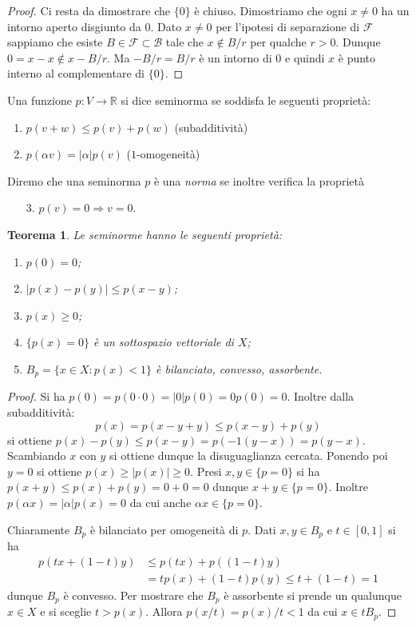 \documentclass[italian,a4paper,oneside,headinclude]{scrbook}
\newcommand{\B}{\mathcal B}
\newcommand{\F}{\mathcal F}
\newcommand{\RR}{\mathbb R}
\newcommand{\abs}[1]{{\left|#1\right|}}
\newtheorem{theorem}{Teorema}
\begin{document}
\begin{proof}
  Ci resta da dimostrare che $\{0\}$ è chiuso. Dimostriamo che ogni
  $x\neq 0$ ha un intorno aperto disgiunto da $0$. Dato $x\neq 0$ per
  l'ipotesi di separazione di $\F$ sappiamo che esiste
  $B\in \F\subset \B$ tale che $x \not \in B/r$ per qualche
  $r>0$. Dunque $0 = x- x \not \in x- B/r$. Ma $-B/r = B/r$ è un
  intorno di $0$ e quindi $x$ è punto interno al complementare di $\{0\}$.

\end{proof}

Una funzione $p\colon V \to \RR$ si dice seminorma se soddisfa le
seguenti proprietà:
\begin{enumerate}
\item $p(v+w)\le p(v) + p(w)$ (subadditività)
\item $p(\alpha v) = \abs{\alpha} p(v)$ ($1$-omogeneità)
\end{enumerate}
Diremo che una seminorma $p$ è una \emph{norma} se inoltre verifica la
proprietà
\begin{enumerate}
  \item[3.] $p(v)=0 \Rightarrow v=0$.
\end{enumerate}

\begin{theorem}
  Le seminorme hanno le seguenti proprietà:
  \begin{enumerate}
  \item $p(0)=0$;
  \item $\abs{p(x)-p(y)} \le p(x-y)$;
  \item $p(x)\ge 0$;
  \item $\{p(x) = 0\}$ è un sottospazio vettoriale di $X$;
  \item $B_p=\{x\in X\colon p(x)<1\} $ è bilanciato, convesso, assorbente.
  \end{enumerate}
\end{theorem}

\begin{proof}
  Si ha  $p(0) = p(0\cdot 0) = \abs{0}p(0) = 0p(0) = 0$.
  Inoltre dalla subadditività:
  \[
  p(x) = p(x-y+y) \le p(x-y) + p(y)
  \]
  si ottiene $p(x) - p(y) \le p(x-y) = p(-1(y-x)) = p(y-x)$.
  Scambiando $x$ con $y$ si ottiene dunque la disuguaglianza cercata.
  Ponendo poi $y=0$ si ottiene $p(x) \ge \abs{p(x)}\ge 0$.
  Presi $x,y\in \{p=0\}$ si ha $p(x+y) \le p(x) + p(y) = 0 + 0 = 0$
  dunque $x+y\in \{p=0\}$. Inoltre $p(\alpha x)=\abs{\alpha} p(x)=0$
  da cui anche $\alpha x \in \{p=0\}$.

  Chiaramente $B_p$ è bilanciato per
  omogeneità di $p$. Dati $x,y \in B_p$ e $t\in[0,1]$ si ha
  \begin{align*}
    p(tx+ (1-t)y) &\le p(tx) + p((1-t)y) \\
    &= tp(x) + (1-t)p(y) \le t + (1-t)
    = 1
  \end{align*}
  dunque $B_p$ è convesso.
  Per mostrare che $B_p$ è assorbente si
  prende un qualunque $x\in X$ e si sceglie $t > p(x)$. Allora
  $p(x/t) = p(x)/t < 1$ da cui $x\in t B_p$.
\end{proof}
\end{document}
